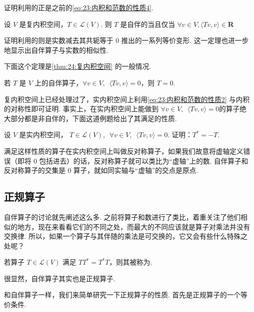证明利用的正是之前的\autoref{eq:23:内积和范数的性质4}.

\begin{theorem}
    设 $ V $ 是复内积空间，$ T \in \mathcal{L}(V) $. 则 $ T $ 是自伴的当且仅当 $ \forall v \in V, \langle Tv, v \rangle \in \mathbf{R} $
\end{theorem}

证明利用的则是实数减去其共轭等于 0 推出的一系列等价变形. 这一定理也进一步地显示出自伴算子与实数的相似性.

下面这个定理是\autoref{thm:24:复内积空间} 的一般情况.

\begin{theorem}
    若 $ T $ 是 $ V $ 上的自伴算子，$ \forall v \in V,\enspace \langle Tv, v \rangle = 0 $，则 $ T = 0 $.
\end{theorem}

复内积空间上已经处理过了，实内积空间上利用\autoref{eq:23:内积和范数的性质2} 与内积的对称性即可证明. 事实上，在实内积空间上能做到 $ \forall v \in V ,\enspace \langle Tv, v \rangle = 0 $的算子绝大部分都是非自伴的，下面这道例题给出了其满足的性质.

\begin{example}
    设 $ V $ 是实内积空间， $ T \in \mathcal{L}(V),\enspace \forall v \in V,\enspace \langle Tv, v \rangle = 0 $. 证明：$ T^* = -T $.
\end{example}

满足这样性质的算子在实内积空间上叫做反对称算子，如果我们故意将虚轴定义错误（即将 0 包括进去）的话，反对称算子就可以类比为``虚轴''上的数. 自伴算子和反对称算子的交集是 0 算子，就如同实轴与``虚轴''的交点是原点.

\subsection{正规算子}

自伴算子的讨论就先阐述这么多. 之前将算子和数进行了类比，着重关注了他们相似的地方，现在来看看它们的不同之处，而最大的不同应该就是算子对乘法并没有交换律. 所以，如果一个算子与其伴随的乘法是可交换的，它又会有些什么特殊之处呢？

\begin{definition}[正规算子] 
    若算子 $ T \in \mathcal{L}(V) $ 满足 $ TT^* = T^*T $，则其被称为.
\end{definition}

很显然，自伴算子其实也是正规算子.

和自伴算子一样，我们来简单研究一下正规算子的性质. 首先是正规算子的一个等价条件.


